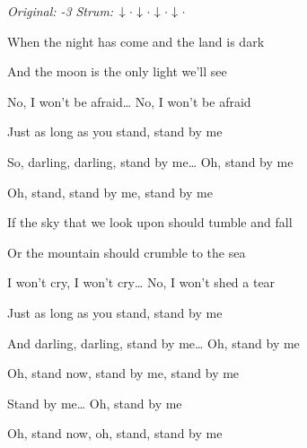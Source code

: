 \begin{song}


\begin{headerbox}
\textit{Original: -3} \quad
\textit{Strum:} $\Down\Miss\Down\Miss\Down\Miss\Down\Miss$
\end{headerbox}

\begin{hchordbox}
\end{hchordbox}

\Large

\bigskip

\Intro {}     \par

\bigskip

When the night has come  and the land is dark \par
And the moon is the only light we'll see \par
No, I won't be afraid… No, I won't be afraid \par
Just as long as you stand, stand by me \par

\bigskip

So, darling, darling, stand by me… Oh, stand by me \par
Oh, stand,  stand by me,  stand by me \par


\bigskip

If the sky that we look upon  should tumble and fall \par
Or the mountain should crumble to the sea \par
I won't cry, I won't cry… No, I won't shed a tear \par
Just as long as you stand, stand by me \par

\bigskip

And darling, darling, stand by me… Oh, stand by me \par
Oh, stand now,  stand by me,  stand by me \par
{} \par

\bigskip

Stand by me… Oh, stand by me \par
Oh, stand now, oh, stand, stand by me \par

\end{song}